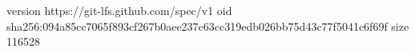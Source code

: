 version https://git-lfs.github.com/spec/v1
oid sha256:094a85cc7065f893cf267b0aee237c63cc319edb026bb75d43c77f5041c6f69f
size 116528
